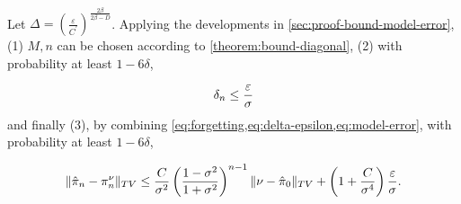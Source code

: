 \paragraph{}

Let $\Delta= \left(\frac{\varepsilon}{C^\prime}\right)^{\frac{2\beta}{2\beta - D}}$. Applying the developments in \cref{sec:proof-bound-model-error}, (1) $M, n$ can be chosen according to \cref{theorem:bound-diagonal}, (2)  with probability at least $1-6\delta$,

\begin{align}\label{eq:delta-epsilon}
    \delta_n \leq \frac{\varepsilon}{\sigma}
\end{align}
and finally (3), by combining \cref{eq:forgetting,eq:delta-epsilon,eq:model-error}, with probability at least $1 - 6\delta$,

\begin{align}
\Vert \hat\pi_n - \pi_n^\nu \Vert_{TV} \leq \frac{C}{\sigma^2}\left(\frac{1 - \sigma^2}{1+\sigma^2}\right)^{n-1}\Vert \nu - \hat \pi_0\Vert_{TV} + \left(1 + \frac{C}{\sigma^4}\right)\frac{\varepsilon}{\sigma}.
\end{align}
